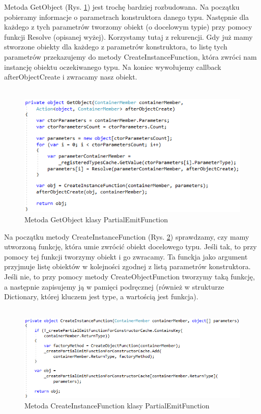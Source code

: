 \documentclass[12pt]{article}
\begin{document}
Metoda GetObject (Rys. \ref{fig:PartialEmitFunction_GetObject}) jest trochę bardziej rozbudowana. Na początku pobieramy informacje o parametrach konstruktora danego typu. Następnie dla każdego z tych parametrów tworzomy obiekt (o docelowym typie) przy pomocy funkcji Resolve (opisanej wyżej). Korzystamy tutaj z rekurencji. Gdy już mamy stworzone obiekty dla każdego z parametrów konstruktora, to listę tych parametrów przekazujemy do metody CreateInstanceFunction, która zwróci nam instancję obiektu oczekiwanego typu. Na koniec wywołujemy callback afterObjectCreate i zwracamy nasz obiekt.\\ \\
\begin{figure}[H]
	\begin{center}
  		\includegraphics{PartialEmitFunction_GetObject.png}
  		\caption{Metoda GetObject klasy PartialEmitFunction}
  		\label{fig:PartialEmitFunction_GetObject}
	\end{center}
\end{figure}

Na początku metody CreateInstanceFunction (Rys. \ref{fig:PartialEmitFunction_CreateInstanceFunction}) sprawdzamy, czy mamy utworzoną funkcję, która umie zwrócić obiekt docelowego typu. Jeśli tak, to przy pomocy tej funkcji tworzymy obiekt  i go zwracamy. Ta funckja jako argument przyjmuje listę obiektów w kolejności zgodnej z listą parametrów konstruktora. Jeśli nie, to przy pomocy metody CreateObjectFunction tworzymy taką funkcję, a następnie zapisujemy ją w pamięci podręcznej (również w strukturze Dictionary, której kluczem jest type, a wartością jest funkcja).\\ \\
\begin{figure}[H]
	\begin{center}
  		\includegraphics{PartialEmitFunction_CreateInstanceFunction.png}
  		\caption{Metoda CreateInstanceFunction klasy PartialEmitFunction}
  		\label{fig:PartialEmitFunction_CreateInstanceFunction}
	\end{center}
\end{figure}
\end{document}
